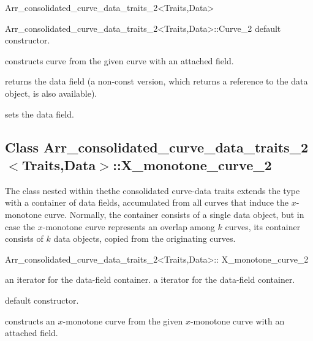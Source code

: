 \begin{ccRefClass}{Arr_consolidated_curve_data_traits_2<Traits,Data>}
\begin{ccClass}{Arr_consolidated_curve_data_traits_2<Traits,Data>::Curve_2}
    {default constructor.}

    {constructs curve from the given  curve with an attached
      field.}

\ccAccessFunctions

  {returns the data field (a non-const version, which returns a reference
   to the data object, is also available).}

  {sets the data field.}

\end{ccClass}

\subsection*{Class Arr\_consolidated\_curve\_data\_traits\_2$<$Traits,Data$>$::X\_monotone\_curve\_2}

The  class nested within thethe consolidated 
curve-data traits extends the  type with 
a container of data fields, accumulated from all curves that induce the
$x$-monotone curve. Normally, the container consists of a single data object,
but in case the $x$-monotone curve represents an overlap among $k$ curves,
its container consists of $k$ data objects, copied from the originating curves.

\begin{ccClass}{Arr_consolidated_curve_data_traits_2<Traits,Data>::
                X_monotone_curve_2}

\ccInheritsFrom

\ccTypes

    {an iterator for the data-field container.}
\ccGlue
{}
    {a  iterator for the data-field container.}

\ccCreation
{}

    {default constructor.}

    {constructs an $x$-monotone curve from the given  $x$-monotone
     curve with an attached  field.}


\end{ccClass}
\end{ccRefClass}
